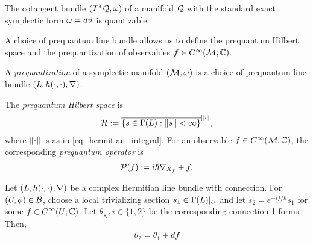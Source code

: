 \documentclass[notas.tex]{subfiles}
\begin{document}
\begin{ex}
	The cotangent bundle $(T^*\mathcal{Q}, \omega)$ of a manifold $\mathcal{Q}$ with the standard exact symplectic form $\omega = d \vartheta$ is quantizable.
\end{ex}

A choice of prequantum line bundle allows us to define the prequantum Hilbert space and the prequantization of observables $f \in C^\infty(\mathcal{M}; \mathbb{C})$.
\begin{defn}
A \emph{prequantization} of a symplectic manifold $(\mathcal{M}, \omega)$ is a choice of prequantum line bundle $(L, h(\cdot,\cdot), \nabla)$.

The \emph{prequantum Hilbert space} is
\begin{align*}
	\mathcal{H} := \overline{\left \{s \in \Gamma(L): \left\lVert s\right\rVert < \infty \right \}}^{\left\lVert\cdot\right\rVert},
\end{align*}
where $\left\lVert\cdot\right\rVert$ is as in \eqref{eq_hermitian_integral}. %
For an observable $f \in C^\infty(\mathcal{M};\mathbb{C})$, the corresponding \emph{prequantum operator} is
\begin{align} \label{eq_prq_def}
	\mathcal{P}(f) := i \hbar \nabla_{X_f} + f.
\end{align}
\end{defn}

\begin{prop}
	Let $(L, h(\cdot,\cdot), \nabla)$ be a complex Hermitian line bundle with connection. For $(U, \phi) \in \mathcal{B}$, choose a local trivializing section $s_1 \in \Gamma(L)|_U$ and let $s_2 = e^{-i f / \hbar} s_1$ for some $f \in C^\infty(U; \mathbb{C})$. Let $\theta_{s_i}, i \in \{1,2\}$ be the corresponding connection 1-forms. Then,   
	\begin{align*}
		\theta_2 = \theta_1 + df
	\end{align*}
\end{prop}

\end{document}
